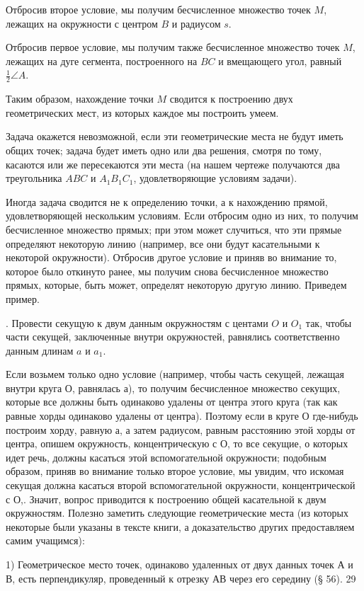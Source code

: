 Отбросив второе условие, мы получим бесчисленное множество точек $M$, лежащих на окружности с центром $B$ и радиусом $s$.

Отбросив первое условие, мы получим также бесчисленное множество точек $M$, лежащих на дуге сегмента, построенного на $BC$ и вмещающего угол, равный $\tfrac12\angle A$.

Таким образом, нахождение точки $M$ сводится к построению двух геометрических мест, из которых каждое мы построить умеем.

Задача окажется невозможной, если эти геометрические места не будут иметь общих точек; задача будет иметь одно или два решения, смотря по тому, касаются или же пересекаются эти места (на нашем чертеже получаются два треугольника $ABC$ и $A_1B_1C_1$, удовлетворяющие условиям задачи).

Иногда задача сводится не к определению точки, а к нахождению прямой, удовлетворяющей нескольким условиям. Если отбросим одно из них, то получим бесчисленное множество прямых; при этом может случиться, что эти прямые определяют некоторую линию (например, все они будут касательными к некоторой окружности). Отбросив другое условие и приняв во внимание то, которое было откинуто ранее, мы получим снова бесчисленное множество прямых, которые, быть может, определят некоторую другую линию. Приведем пример.

. Провести секущую к двум данным окружностям с центами $O$ и $O_1$ так, чтобы части секущей, заключенные внутри окружностей, равнялись соответственно данным длинам $a$ и $a_1$.

Если возьмем только одно условие (например, чтобы часть секущей, лежащая внутри круга О, равнялась а), то получим бесчисленное множество секущих, которые все должны быть одинаково удалены от центра этого круга (так как равные хорды одинаково удалены от центра). Поэтому если в круге О где-нибудь построим хорду, равную а, а затем радиусом, равным расстоянию этой хорды от центра, опишем окружность, концентрическую с О, то все секущие, о которых идет речь, должны касаться этой вспомогательной окружности; подобным образом, приняв во внимание только второе условие, мы увидим, что искомая секущая должна касаться второй вспомогательной окружности, концентрической с О,. Значит, вопрос приводится к построению общей касательной к двум окружностям.
Полезно заметить следующие геометрические места (из которых некоторые были указаны в тексте книги, а доказательство других предоставляем самим учащимся):

1) Геометрическое место точек, одинаково удаленных от двух данных точек А и В, есть перпендикуляр, проведенный к отрезку АВ через его середину (§ 56).
29

